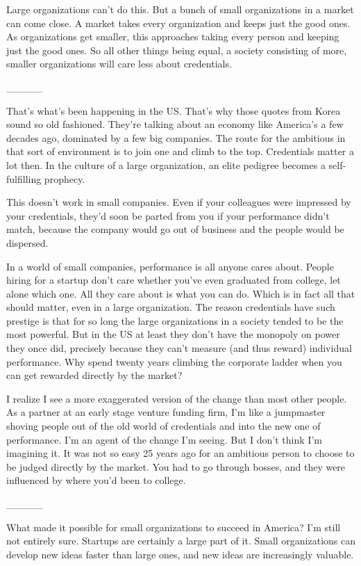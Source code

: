 \documentclass[12pt]{book}
\begin{document}
Large organizations can't do this. But a bunch of small organizations in
a market can come close. A market takes every organization and keeps
just the good ones. As organizations get smaller, this approaches taking
every person and keeping just the good ones. So all other things being
equal, a society consisting of more, smaller organizations will care
less about credentials.

\_\_\_\_\_

That's what's been happening in the US. That's why those quotes from
Korea sound so old fashioned. They're talking about an economy like
America's a few decades ago, dominated by a few big companies. The route
for the ambitious in that sort of environment is to join one and climb
to the top. Credentials matter a lot then. In the culture of a large
organization, an elite pedigree becomes a self-fulfilling prophecy.

This doesn't work in small companies. Even if your colleagues were
impressed by your credentials, they'd soon be parted from you if your
performance didn't match, because the company would go out of business
and the people would be dispersed.

In a world of small companies, performance is all anyone cares about.
People hiring for a startup don't care whether you've even graduated
from college, let alone which one. All they care about is what you can
do. Which is in fact all that should matter, even in a large
organization. The reason credentials have such prestige is that for so
long the large organizations in a society tended to be the most
powerful. But in the US at least they don't have the monopoly on power
they once did, precisely because they can't measure (and thus reward)
individual performance. Why spend twenty years climbing the corporate
ladder when you can get rewarded directly by the market?

I realize I see a more exaggerated version of the change than most other
people. As a partner at an early stage venture funding firm, I'm like a
jumpmaster shoving people out of the old world of credentials and into
the new one of performance. I'm an agent of the change I'm seeing. But I
don't think I'm imagining it. It was not so easy 25 years ago for an
ambitious person to choose to be judged directly by the market. You had
to go through bosses, and they were influenced by where you'd been to
college.

\_\_\_\_\_

What made it possible for small organizations to succeed in America? I'm
still not entirely sure. Startups are certainly a large part of it.
Small organizations can develop new ideas faster than large ones, and
new ideas are increasingly valuable.
\end{document}
